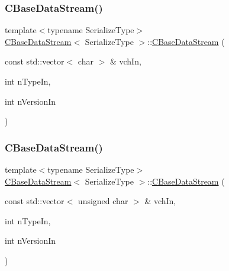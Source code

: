 \mbox{\label{class_c_base_data_stream_a9f49c3d8343a6b9bb9b16e21dc304321}} 
\subsubsection{\texorpdfstring{C\+Base\+Data\+Stream()}{CBaseDataStream()}\hspace{0.1cm}{\footnotesize\ttfamily [5/6]}}
{\footnotesize\ttfamily template$<$typename Serialize\+Type$>$ \\
\mbox{\hyperlink{class_c_base_data_stream}{C\+Base\+Data\+Stream}}$<$ Serialize\+Type $>$\+::\mbox{\hyperlink{class_c_base_data_stream}{C\+Base\+Data\+Stream}} (\begin{DoxyParamCaption}\item[{const std\+::vector$<$ char $>$ \&}]{vch\+In,  }\item[{int}]{n\+Type\+In,  }\item[{int}]{n\+Version\+In }\end{DoxyParamCaption})\hspace{0.3cm}{\ttfamily [inline]}}

\mbox{\label{class_c_base_data_stream_a7dd6b67c520b5d2ad7a39d94632ebd19}} 
\subsubsection{\texorpdfstring{C\+Base\+Data\+Stream()}{CBaseDataStream()}\hspace{0.1cm}{\footnotesize\ttfamily [6/6]}}
{\footnotesize\ttfamily template$<$typename Serialize\+Type$>$ \\
\mbox{\hyperlink{class_c_base_data_stream}{C\+Base\+Data\+Stream}}$<$ Serialize\+Type $>$\+::\mbox{\hyperlink{class_c_base_data_stream}{C\+Base\+Data\+Stream}} (\begin{DoxyParamCaption}\item[{const std\+::vector$<$ unsigned char $>$ \&}]{vch\+In,  }\item[{int}]{n\+Type\+In,  }\item[{int}]{n\+Version\+In }\end{DoxyParamCaption})\hspace{0.3cm}{\ttfamily [inline]}}



